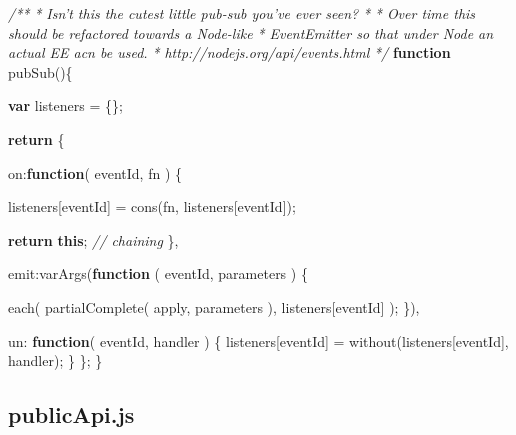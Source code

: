\documentclass[12pt, ]{article}
\newenvironment{Shaded}{}{}
\newcommand{\KeywordTok}[1]{\textcolor[rgb]{0.00,0.44,0.13}{\textbf{{#1}}}}
\newcommand{\DataTypeTok}[1]{\textcolor[rgb]{0.56,0.13,0.00}{{#1}}}
\newcommand{\CommentTok}[1]{\textcolor[rgb]{0.38,0.63,0.69}{\textit{{#1}}}}
\newcommand{\FunctionTok}[1]{\textcolor[rgb]{0.02,0.16,0.49}{{#1}}}
\newcommand{\NormalTok}[1]{{#1}}
\begin{document}
\begin{Shaded}
\begin{Highlighting}[]
\CommentTok{/**}
\CommentTok{ * Isn't this the cutest little pub-sub you've ever seen?}
\CommentTok{ * }
\CommentTok{ * Over time this should be refactored towards a Node-like}
\CommentTok{ *    EventEmitter so that under Node an actual EE acn be used.}
\CommentTok{ *    http://nodejs.org/api/events.html}
\CommentTok{ */}
\KeywordTok{function} \FunctionTok{pubSub}\NormalTok{()\{}

   \KeywordTok{var} \NormalTok{listeners = \{\};}
                             
   \KeywordTok{return} \NormalTok{\{}

      \DataTypeTok{on}\NormalTok{:}\KeywordTok{function}\NormalTok{( eventId, fn ) \{}
         
         \NormalTok{listeners[eventId] = }\FunctionTok{cons}\NormalTok{(fn, listeners[eventId]);}

         \KeywordTok{return} \KeywordTok{this}\NormalTok{; }\CommentTok{// chaining}
      \NormalTok{\}, }
    
      \DataTypeTok{emit}\NormalTok{:}\FunctionTok{varArgs}\NormalTok{(}\KeywordTok{function} \NormalTok{( eventId, parameters ) \{}
               
         \FunctionTok{each}\NormalTok{( }
            \FunctionTok{partialComplete}\NormalTok{( apply, parameters ), }
            \NormalTok{listeners[eventId]}
         \NormalTok{);}
      \NormalTok{\}),}
      
      \DataTypeTok{un}\NormalTok{: }\KeywordTok{function}\NormalTok{( eventId, handler ) \{}
         \NormalTok{listeners[eventId] = }\FunctionTok{without}\NormalTok{(listeners[eventId], handler);}
      \NormalTok{\}           }
   \NormalTok{\};}
\NormalTok{\}}
\end{Highlighting}
\end{Shaded}

\pagebreak

\subsection{publicApi.js}\label{headerux5fpublicApi}

\label{src_publicApi}
\end{document}
